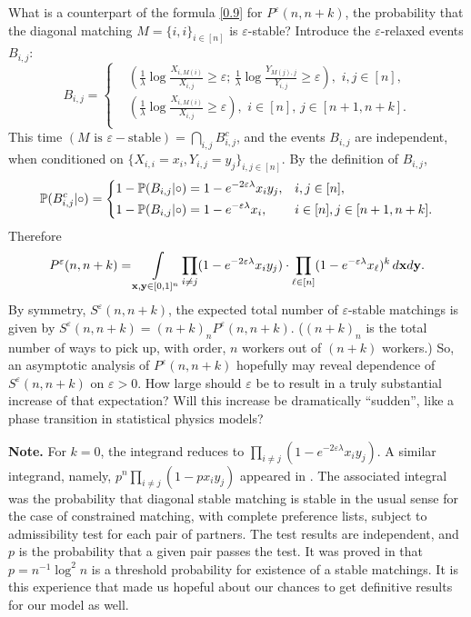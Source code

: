 \documentclass[11pt]{amsart}
\newcommand{\Prob}{\operatorname{\Bbb{P}}}
\def\eps{\varepsilon}
\def\la{\lambda}
\theoremstyle{remark}
\numberwithin{equation}{section}
\begin{document}
What is a counterpart of the formula \eqref{0.9} for $P^{\eps}(n,n+k)$, the probability that the diagonal matching $M=\{i,i\}_{i\in [n]} $ is $\eps$-stable? Introduce the $\eps$-relaxed events $B_{i,j}$:
\[
B_{i,j}=\left\{\begin{aligned}
&\left(\frac{1}{\la}\log\frac{X_{i,M(i)}}{X_{i,j}}\ge\eps;\,
\frac{1}{\la}\log\frac{Y_{M(j),j}}{Y_{i,j}}\ge\eps\right),\,\,i,j\in [n],\\
&\left(\frac{1}{\la}\log\frac{X_{i,M(i)}}{X_{i,j}}\ge\eps\right),\,\,i\in [n],\, j\in [n+1,n+k].\\
\end{aligned}\right.
\]
This time $(M\text{ is }\eps-\text{stable})=\bigcap_{i,j}B_{i,j}^c$, and the events $B_{i,j}$ are independent, when conditioned on $\{X_{i,i}=x_i,
Y_{i,j}=y_j\}_{i,j\in [n]}$. By the definition of $B_{i,j}$,
\[
\Prob(B_{i,j}^c|\circ)=\left\{\begin{aligned}
&1-\Prob(B_{i,j}|\circ)=1-e^{-2\eps\la}x_iy_j,&&i,j\in [n],\\
&1-\Prob(B_{i,j}|\circ)=1-e^{-\eps\la} x_i, &&i\in [n], j\in [n+1,n+k].\end{aligned}\right.
\]
Therefore
\begin{equation}\label{3}
P^{\eps}(n,n+k)=\int\limits_{\bold x,\bold y\in [0,1]^n}\!\prod_{i\neq j}(1-e^{-2\eps\lambda}x_iy_j)\cdot\prod_{\ell\in [n]}(1-e^{-\eps\lambda}x_{\ell})^k\,d\bold x d\bold y.
\end{equation}
By symmetry, $S^{\eps}(n,n+k)$, the expected total number of $\eps$-stable matchings is given by $S^{\eps}(n,n+k)=(n+k)_n
P^{\eps}(n,n+k)$. ($(n+k)_n$ is the total number of ways to pick up, with order, $n$ workers out of $(n+k)$ workers.) So, an asymptotic analysis of $P^{\eps}(n,n+k)$ hopefully may reveal dependence of $S^{\eps}(n,n+k)$ on $\eps>0$. How large should $\eps$ be to result in a truly substantial increase of that expectation? Will this increase be dramatically
``sudden'', like a phase transition in statistical physics models? 



{\bf Note.\/} For $k=0$, the integrand reduces to $\prod_{i\neq j}(1-e^{-2\eps\lambda}x_iy_j)$.  A similar integrand,
namely, $p^n\prod_{i\neq j}(1-px_iy_j)$ appeared in \cite{Pit3}. The associated integral was the probability that diagonal stable matching is stable in the usual sense for the case of constrained matching, with complete preference lists, subject to admissibility test for each pair of partners. The test results are independent, and $p$ is the probability that a given pair passes the test. It was proved in \cite{Pit3} that $p=
n^{-1}\log ^2n$ is a threshold probability for existence of a stable matchings. It is this experience that made us hopeful about our chances to get definitive results for our model as well. 
\end{document}
